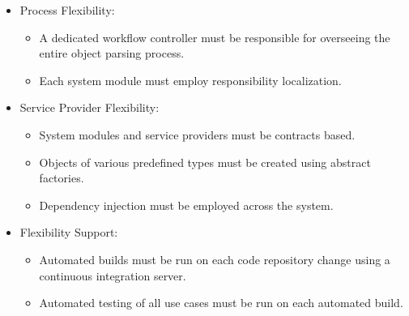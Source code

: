 \documentclass[a4paper,12pt]{article}
\begin{document}
\begin{itemize}
				\begin{itemize}
					\item Process Flexibility:
						\begin{itemize}
							\item A dedicated workflow controller must be responsible for overseeing the entire object parsing process.
							\item Each system module must employ responsibility localization.
						\end{itemize}
					\item Service Provider Flexibility:
						\begin{itemize}
							\item System modules and service providers must be contracts based.
							\item Objects of various predefined types must be created using abstract factories.
							\item Dependency injection must be employed across the system.
						\end{itemize}
					\item Flexibility Support:
						\begin{itemize}
							\item Automated builds must be run on each code repository change using a continuous integration server.
							\item Automated testing of all use cases must be run on each automated build.
						\end{itemize}
				\end{itemize}
		\end{itemize}
%
%
\end{document}
